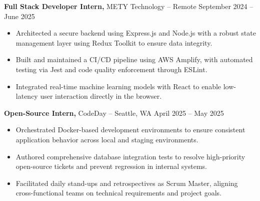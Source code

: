 \documentclass[11pt]{article}       %
\begin{document}
\textbf{Full Stack Developer Intern,} {METY Technology} -- Remote \hfill September 2024 -- June 2025 \\
\vspace{-9pt}
\begin{itemize}
  \item Architected a secure backend using Express.js and Node.js with a robust state management layer using Redux Toolkit to ensure data integrity.
  \item Built and maintained a CI/CD pipeline using AWS Amplify, with automated testing via Jest and code quality enforcement through ESLint.
  \item Integrated real-time machine learning models with React to enable low-latency user interaction directly in the browser.
\end{itemize}

\textbf{Open-Source Intern,} {CodeDay} -- Seattle, WA \hfill April 2025 -- May 2025 \\
\vspace{-9pt}
\begin{itemize}
  \item Orchestrated Docker-based development environments to ensure consistent application behavior across local and staging environments.
  \item Authored comprehensive database integration tests to resolve high-priority open-source tickets and prevent regression in internal systems.
  \item Facilitated daily stand-ups and retrospectives as Scrum Master, aligning cross-functional teams on technical requirements and project goals.
\end{itemize}

\end{document}
